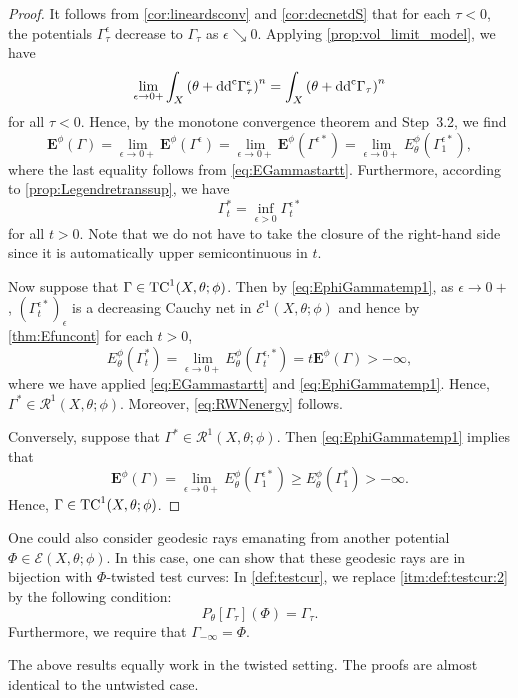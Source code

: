 \begin{proof}
    It follows from \cref{cor:lineardsconv} and \cref{cor:decnetdS} that for each $\tau<0$, the potentials $\Gamma^{\epsilon}_{\tau}$ decrease to $\Gamma_{\tau}$ as $\epsilon\searrow 0$. Applying \cref{prop:vol_limit_model}, we have
    \[
    \lim_{\epsilon \to 0+} \int_X \left(\theta+\mathrm{dd}^{\mathrm{c}} \Gamma^{\epsilon}_{\tau}\right)^n=\int_X \left(\theta+\mathrm{dd}^{\mathrm{c}} \Gamma_{\tau}\right)^n
    \]
    for all $\tau<0$. Hence, by the monotone convergence theorem and Step~3.2, we find
    \begin{equation}\label{eq:EphiGammatemp1}
        \mathbf{E}^{\phi}(\Gamma)=\lim_{\epsilon\to 0+}\mathbf{E}^{\phi}(\Gamma^{\epsilon})=\lim_{\epsilon\to 0+}\mathbf{E}^{\phi}(\Gamma^{\epsilon *})=\lim_{\epsilon\to 0+} E_{\theta}^{\phi}(\Gamma^{\epsilon *}_1),
    \end{equation}
    where the last equality follows from \eqref{eq:EGammastartt}.
    Furthermore, according to \cref{prop:Legendretranssup}, we have
    \[
    \Gamma^*_t=\inf_{\epsilon>0} \Gamma^{\epsilon *}_t
    \]
    for all $t>0$. Note that we do not have to take the closure of the right-hand side since it is automatically upper semicontinuous in $t$.

    Now suppose that $\Gamma\in \mathrm{TC}^1(X,\theta;\phi)$.
    Then by \eqref{eq:EphiGammatemp1}, as $\epsilon\to 0+$, $(\Gamma_t^{\epsilon *})_{\epsilon}$ is a decreasing Cauchy net in $\mathcal{E}^1(X,\theta;\phi)$ and hence by \cref{thm:Efuncont} for each $t>0$,
    \[
    E_{\theta}^{\phi}\left(\Gamma^*_t\right)=\lim_{\epsilon\to 0+}E_{\theta}^{\phi}\left(\Gamma^{\epsilon,*}_t\right)=t\mathbf{E}^{\phi}(\Gamma)>-\infty,
    \]
    where we have applied \eqref{eq:EGammastartt} and \eqref{eq:EphiGammatemp1}.
    Hence, $\Gamma^*\in \mathcal{R}^1(X,\theta;\phi)$. Moreover, \eqref{eq:RWNenergy} follows.

    Conversely, suppose that $\Gamma^*\in \mathcal{R}^1(X,\theta;\phi)$. Then \eqref{eq:EphiGammatemp1} implies that
    \[
    \mathbf{E}^{\phi}(\Gamma)=\lim_{\epsilon\to 0+} E_{\theta}^{\phi}\left(\Gamma^{\epsilon *}_1\right) \geq E_{\theta}^{\phi}\left(\Gamma^*_1\right)>-\infty.
    \]
    Hence, $\Gamma\in \mathrm{TC}^1(X,\theta;\phi)$.
\end{proof}

\begin{remark}\label{rmk:testcurve:L815}
    One could also consider geodesic rays emanating from another potential $\Phi \in \mathcal{E}(X,\theta;\phi)$. In this case, one can show that these geodesic rays are in bijection with $\Phi$-twisted test curves: In \cref{def:testcur}, we replace \ref{itm:def:testcur:2} by the following condition:
    \[
        P_{\theta}\left[\Gamma_{\tau}\right](\Phi)=\Gamma_{\tau}.
    \]
    Furthermore, we require that $\Gamma_{-\infty}=\Phi$.

    The above results equally work in the twisted setting.
    The proofs are almost identical to the untwisted case.
\end{remark}

